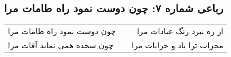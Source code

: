\begin{center}
\section*{رباعی شماره ۷: چون دوست نمود راه طامات مرا}
\label{sec:sh007}
\begin{longtable}{l p{0.5cm} r}
چون دوست نمود راه طامات مرا
&&
از ره نبرد رنگ عبادات مرا
\\
چون سجده همی نماید آفات مرا
&&
محراب ترا باد و خرابات مرا
\\
\end{longtable}
\end{center}
